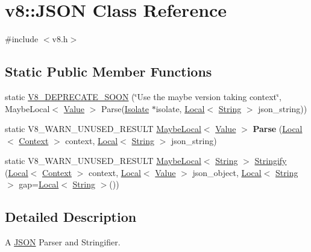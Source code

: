 \hypertarget{classv8_1_1JSON}{}\section{v8\+:\+:J\+S\+ON Class Reference}
\label{classv8_1_1JSON}


{\ttfamily \#include $<$v8.\+h$>$}

\subsection*{Static Public Member Functions}
\begin{DoxyCompactItemize}
\item 
static \mbox{\hyperlink{classv8_1_1JSON_ae87740238959f9a8536d8e70daf37104}{V8\+\_\+\+D\+E\+P\+R\+E\+C\+A\+T\+E\+\_\+\+S\+O\+ON}} (\char`\"{}Use the maybe version taking context\char`\"{}, Maybe\+Local$<$ \mbox{\hyperlink{classv8_1_1Value}{Value}} $>$ Parse(\mbox{\hyperlink{classv8_1_1Isolate}{Isolate}} $\ast$isolate, \mbox{\hyperlink{classv8_1_1Local}{Local}}$<$ \mbox{\hyperlink{classv8_1_1String}{String}} $>$ json\+\_\+string))
\item 
\mbox{\label{classv8_1_1JSON_acd9320e365e9ac941c761c3e4b3e209d}} 
static V8\+\_\+\+W\+A\+R\+N\+\_\+\+U\+N\+U\+S\+E\+D\+\_\+\+R\+E\+S\+U\+LT \mbox{\hyperlink{classv8_1_1MaybeLocal}{Maybe\+Local}}$<$ \mbox{\hyperlink{classv8_1_1Value}{Value}} $>$ {\bfseries Parse} (\mbox{\hyperlink{classv8_1_1Local}{Local}}$<$ \mbox{\hyperlink{classv8_1_1Context}{Context}} $>$ context, \mbox{\hyperlink{classv8_1_1Local}{Local}}$<$ \mbox{\hyperlink{classv8_1_1String}{String}} $>$ json\+\_\+string)
\item 
static V8\+\_\+\+W\+A\+R\+N\+\_\+\+U\+N\+U\+S\+E\+D\+\_\+\+R\+E\+S\+U\+LT \mbox{\hyperlink{classv8_1_1MaybeLocal}{Maybe\+Local}}$<$ \mbox{\hyperlink{classv8_1_1String}{String}} $>$ \mbox{\hyperlink{classv8_1_1JSON_ac5ddb9edc1369a7d889b7ac8411e7b71}{Stringify}} (\mbox{\hyperlink{classv8_1_1Local}{Local}}$<$ \mbox{\hyperlink{classv8_1_1Context}{Context}} $>$ context, \mbox{\hyperlink{classv8_1_1Local}{Local}}$<$ \mbox{\hyperlink{classv8_1_1Value}{Value}} $>$ json\+\_\+object, \mbox{\hyperlink{classv8_1_1Local}{Local}}$<$ \mbox{\hyperlink{classv8_1_1String}{String}} $>$ gap=\mbox{\hyperlink{classv8_1_1Local}{Local}}$<$ \mbox{\hyperlink{classv8_1_1String}{String}} $>$())
\end{DoxyCompactItemize}


\subsection{Detailed Description}
A \mbox{\hyperlink{classv8_1_1JSON}{J\+S\+ON}} Parser and Stringifier. 

